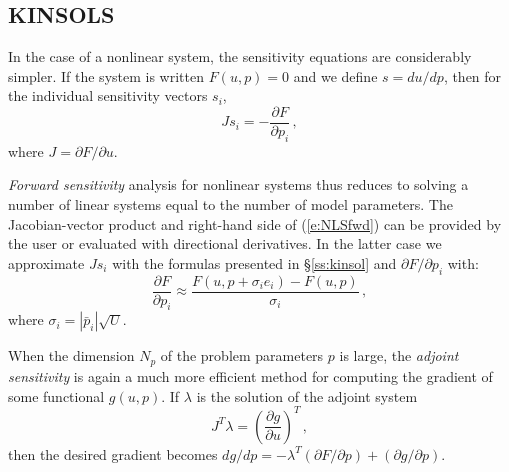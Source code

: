 \subsection{KINSOLS}

In the case of a nonlinear system, the sensitivity equations are
considerably simpler.  If the system is written $F(u,p) = 0$ and we
define $s = d u / d p$, then for the individual sensitivity vectors $s_i$,
\begin{equation}\label{e:NLSfwd}
  J s_i = -\frac{\partial F}{\partial p_i} \, ,
\end{equation}
where $ J = \partial F / \partial u$. 

{\em Forward sensitivity} analysis for nonlinear systems thus reduces to solving a 
number of linear systems equal to the number of model parameters. 
The Jacobian-vector product and right-hand side of (\ref{e:NLSfwd}) can be provided 
by the user or evaluated with directional derivatives. In the latter case
we approximate $J s_i$ with the formulas presented in \S\ref{ss:kinsol} 
and ${\partial F}/{\partial p_i}$ with:
\begin{equation*}
\frac{\partial F}{\partial p_i} \approx \frac{F(u,p + \sigma_i e_i)-
    F(u,p)}{\sigma_i} \, ,
\end{equation*}
where $\sigma_i = |{\bar p}_i| \sqrt{U}$.

When the dimension $N_p$ of the problem parameters $p$ is large, the 
{\em adjoint sensitivity} is again a much more efficient method for computing 
the gradient of some functional $g(u,p)$. If $\lambda$ is the solution of
the adjoint system
\begin{equation}\label{e:NLSadj}
  J^T \lambda = \left( \frac{\partial g}{\partial u} \right)^T \, ,
\end{equation}
then the desired gradient becomes
${dg}/{dp} = -\lambda^T ({\partial F}/{\partial p}) + ({\partial g}/{\partial p})$.
